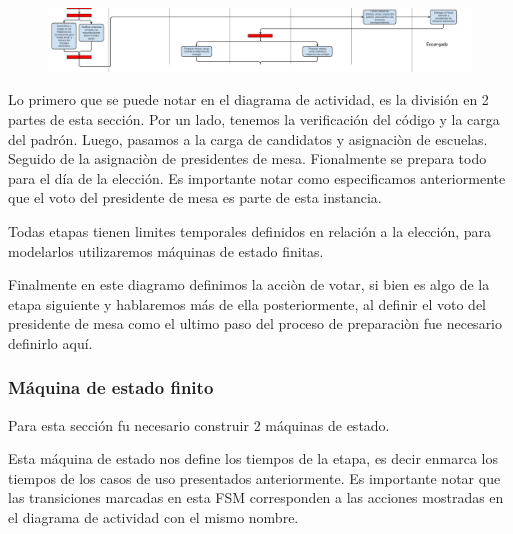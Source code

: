 \begin{figure}[h!]
\centering
\includegraphics[scale=0.5]{imagenes/actividad/actividadPreparacion3}
\end{figure}


Lo primero que se puede notar en el diagrama de actividad, es la división en 2 partes de esta sección. Por un lado, tenemos la verificación del código y la carga del padrón. Luego, pasamos a la carga de candidatos y asignaciòn de escuelas. Seguido de la asignaciòn de presidentes de mesa. Fionalmente se prepara todo para el día de la elección. Es importante notar como especificamos anteriormente que el voto del presidente de mesa es parte de esta instancia. 

Todas etapas tienen limites temporales definidos en relación a la elección, para modelarlos utilizaremos máquinas de estado finitas.

Finalmente en este diagramo definimos la acciòn de votar, si bien es algo de la etapa siguiente y hablaremos más de ella posteriormente, al definir el voto del presidente de mesa como el ultimo paso del proceso de preparaciòn fue necesario definirlo aquí.


\subsubsection{Máquina de estado finito}

Para esta sección fu necesario construir 2 máquinas de estado.

\begin{figure}[H]
\centering
\end{figure}

Esta máquina de estado nos define los tiempos de la etapa, es decir enmarca los tiempos de los casos de uso presentados anteriormente. Es importante notar que las transiciones marcadas en esta FSM corresponden a las acciones mostradas en el diagrama de actividad con el mismo nombre.

\begin{figure}[H]
\centering
\end{figure}


